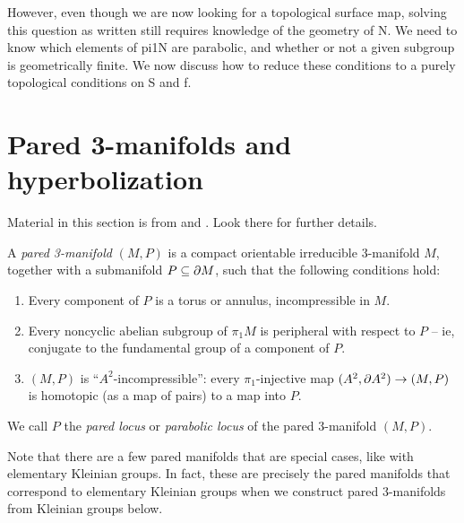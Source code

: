 However, even though we are now looking for a topological surface map, solving
this question as written still requires knowledge of the geometry of N. We need
to know which elements of pi1N are parabolic, and whether or not a given
subgroup is geometrically finite. We now discuss how to reduce these conditions
to a purely topological conditions on S and f.

\section{Pared 3-manifolds and hyperbolization}

Material in this section is from \cite{Mo} and \cite{CMc}. Look there for
further details.

%
\begin{defn}

A \emph{pared 3-manifold} $(M,P)$ is a compact orientable irreducible
3-manifold $M$, together with a submanifold $P\subseteq\partial M$, such that the
following conditions hold:

\begin{enumerate}
\item Every component of $P$ is a torus or annulus, incompressible in $M$.

\item Every noncyclic abelian subgroup of $\pi_1M$ is peripheral with respect
to $P$ -- ie, conjugate to the fundamental group of a component of $P$.

\item $(M,P)$ is ``$A^2$-incompressible'': every $\pi_1$-injective map $(A^2,
\partial A^2) \to (M,P)$ is homotopic (as a map of pairs) to a map into $P$.

\end{enumerate}

We call $P$ the \emph{pared locus} or \emph{parabolic locus} of the pared
3-manifold $(M,P)$.

\end{defn}

Note that there are a few pared manifolds that are special cases, like with
elementary Kleinian groups. In fact, these are precisely the pared manifolds
that correspond to elementary Kleinian groups when we construct pared
3-manifolds from Kleinian groups below.


